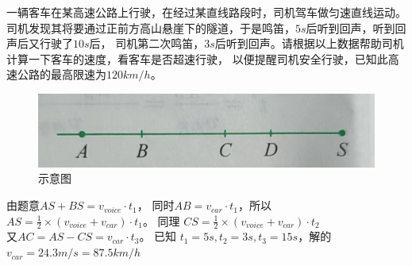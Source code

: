 \documentclass[windows,csize4, answers]{BHCexam}
\begin{document}
\begin{groups}
\begin{questions}[]
        \question[5] 一辆客车在某高速公路上行驶，在经过某直线路段时，司机驾车做匀速直线运动。
        司机发现其将要通过正前方高山悬崖下的隧道，于是鸣笛，$5s$后听到回声，听到回声后又行驶了$10s$后，
        司机第二次鸣笛，$3s$后听到回声。请根据以上数据帮助司机计算一下客车的速度，看客车是否超速行驶，
        以便提醒司机安全行驶，已知此高速公路的最高限速为$120km/h$。
        \begin{figure}[htb]
            \centering
            \includegraphics [scale=0.3,trim=0 0 0 0]{./image/fig_2_6.jpg}
            \caption{示意图}
            \label{fig:fig_2_6}
        \end{figure}
        \begin{solution}{0.5cm}
            \methodonly
            由题意$AS+BS=v_{voice}\cdot t_{1}$，
            同时$AB=v_{car}\cdot t_1$，所以$AS=\frac{1}{2}\times (v_{voice}+v_{car})\cdot t_1$。
            同理 $CS=\frac{1}{2}\times (v_{voice}+v_{car})\cdot t_2$ \\
            又$AC=AS-CS=v_{car}\cdot t_3$。
            已知 $t_1=5s,t_2=3s, t_3=15s$，解的$v_{car}=24.3m/s=87.5km/h$
        \end{solution}

        \vspace{3.5cm}


\end{questions}
\end{groups}
\end{document}
